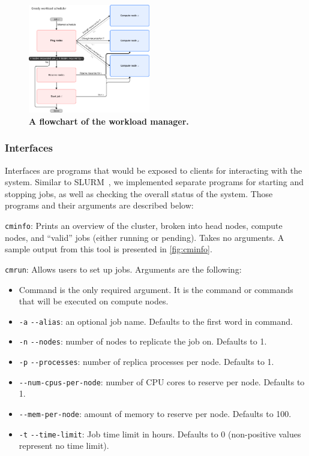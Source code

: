 \documentclass[sigconf]{acmart}
\begin{document}
\begin{figure}[ht]
    \centering
    \includegraphics[width=0.475\textwidth]{figures/wlm.pdf}
    \caption{
        \textbf{A flowchart of the workload manager.}
    }
    \label{fig:wlm}
\end{figure}

\subsubsection{Interfaces}
Interfaces are programs that would be exposed to clients for interacting with the system.
Similar to SLURM~\cite{yoo2003slurm}, we implemented separate programs for starting and stopping jobs, as well as checking the
overall status of the system.
Those programs and their arguments are described below:

\verb|cminfo|: Prints an overview of the cluster, broken into head nodes, compute nodes, and ``valid''
jobs (either running or pending). Takes no arguments. A sample output from this tool is presented in \cref{fig:cminfo}.

\verb|cmrun|: Allows users to set up jobs. Arguments are the following:
\begin{itemize}
    \item Command is the only required argument. It is the command or commands that will be executed on compute nodes.
    \item \verb|-a| \verb|--alias|: an optional job name. Defaults to the first word in command.
    \item \verb|-n| \verb|--nodes|: number of nodes to replicate the job on. Defaults to 1.
    \item \verb|-p| \verb|--processes|: number of replica processes per node. Defaults to 1.
    \item \verb|--num-cpus-per-node|: number of CPU cores to reserve per node. Defaults to 1.
    \item \verb|--mem-per-node|: amount of memory to reserve per node. Defaults to 100.
    \item \verb|-t| \verb|--time-limit|: Job time limit in hours. Defaults to 0 (non-positive values represent no time limit).
\end{itemize}
\end{document}
